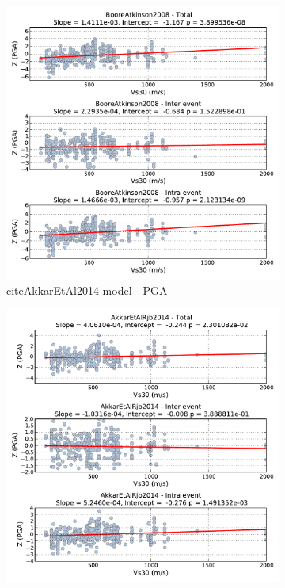 \begin{figure}[htb]
  \centering
  \begin{subfigure}[b]{0.49\textwidth}
      \includegraphics[width=\textwidth]{./figures/residuals/BA2008_Vs30_PGA.pdf}
      \caption{citeAkkarEtAl2014 model - PGA}
      \label{fig:pga_vs30_ba2008}
  \end{subfigure}
    \begin{subfigure}[b]{0.49\textwidth}
      \includegraphics[width=\textwidth]{./figures/residuals/Akkar2014_Vs30_PGA.pdf}

\end{subfigure}
\end{figure}
